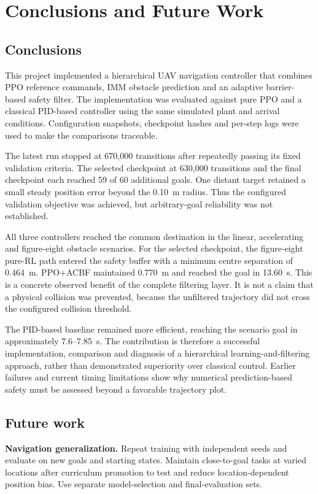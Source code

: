 \chapter{Conclusions and Future Work}\label{ch:conclusion}
\section{Conclusions}
This project implemented a hierarchical UAV navigation controller that combines PPO reference commands, IMM obstacle prediction and an adaptive barrier-based safety filter. The implementation was evaluated against pure PPO and a classical PID-based controller using the same simulated plant and arrival conditions. Configuration snapshots, checkpoint hashes and per-step logs were used to make the comparisons traceable.

The latest run stopped at 670,000 transitions after repeatedly passing its fixed validation criteria. The selected checkpoint at 630,000 transitions and the final checkpoint each reached 59 of 60 additional goals. One distant target retained a small steady position error beyond the 0.10~m radius. Thus the configured validation objective was achieved, but arbitrary-goal reliability was not established.

All three controllers reached the common destination in the linear, accelerating and figure-eight obstacle scenarios. For the selected checkpoint, the figure-eight pure-RL path entered the safety buffer with a minimum centre separation of 0.464~m. PPO+ACBF maintained 0.770~m and reached the goal in 13.60~s. This is a concrete observed benefit of the complete filtering layer. It is not a claim that a physical collision was prevented, because the unfiltered trajectory did not cross the configured collision threshold.

The PID-based baseline remained more efficient, reaching the scenario goal in approximately 7.6--7.85~s. The contribution is therefore a successful implementation, comparison and diagnosis of a hierarchical learning-and-filtering approach, rather than demonstrated superiority over classical control. Earlier failures and current timing limitations show why numerical prediction-based safety must be assessed beyond a favorable trajectory plot.

\section{Future work}
\textbf{Navigation generalization.} Repeat training with independent seeds and evaluate on new goals and starting states. Maintain close-to-goal tasks at varied locations after curriculum promotion to test and reduce location-dependent position bias. Use separate model-selection and final-evaluation sets.


